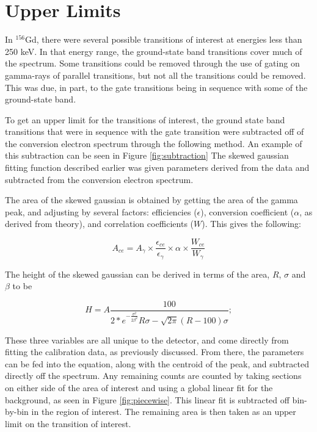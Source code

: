 \section{Upper Limits}
\label{sec:upper_limit}

In $^{156}$Gd, there were several possible transitions of interest at energies less than 250 keV. In that energy range, the ground-state band transitions cover much of the spectrum. Some transitions could be removed through the use of gating on gamma-rays of parallel transitions, but not all the transitions could be removed. This was due, in part, to the gate transitions being in sequence with some of the ground-state band. 

To get an upper limit for the transitions of interest, the ground state band transitions that were in sequence with the gate transition were subtracted off of the conversion electron spectrum through the following method. An example of this subtraction can be seen in Figure \ref{fig:subtraction} The skewed gaussian fitting function described earlier was given parameters derived from the data and subtracted from the conversion electron spectrum.



The area of the skewed gaussian is obtained by getting the area of the gamma peak, and adjusting by several factors: efficiencies ($\epsilon$), conversion coefficient ($\alpha$, as derived from theory), and correlation coefficients ($W$). This gives the following:

\begin{equation}
    A_{ce} = A_{\gamma}\times\frac{\epsilon_{ce}}{\epsilon_{\gamma}}\times\alpha\times\frac{W_{ce}}{W_{\gamma}}
    \label{eq:subt_area_skew}
\end{equation}

The height of the skewed gaussian can be derived in terms of the area, $R$, $\sigma$ and $\beta$ to be

\begin{equation}
    H = A\frac{100}{2*e^{-\frac{\sigma^2}{2\beta^2}}R\sigma-\sqrt{2\pi}(R-100)\sigma};
    \label{eq:subt_height_skew}
\end{equation}

These three variables are all unique to the detector, and come directly from fitting the calibration data, as previously discussed. From there, the parameters can be fed into the equation, along with the centroid of the peak, and subtracted directly off the spectrum. Any remaining counts are counted by taking sections on either side of the area of interest and using a global linear fit for the background, as seen in Figure \ref{fig:piecewise}. This linear fit is subtracted off bin-by-bin in the region of interest. The remaining area is then taken as an upper limit on the transition of interest.

